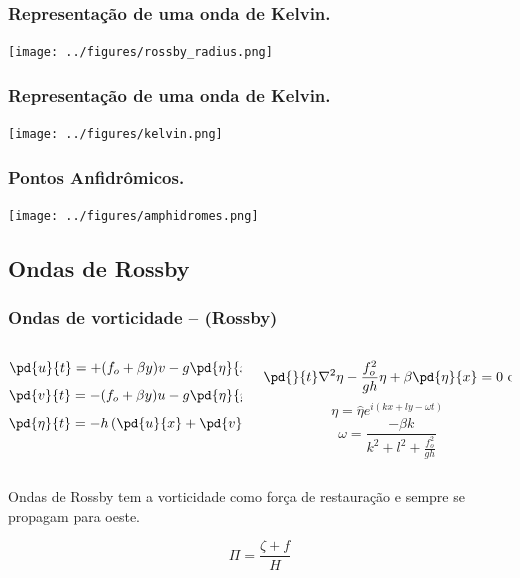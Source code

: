 \begin{frame}
  \frametitle{Representação de uma onda de Kelvin.}
  \begin{center}
    \texttt{[image: ../figures/rossby\_radius.png]}
  \end{center}
\end{frame}


\begin{frame}
  \frametitle{Representação de uma onda de Kelvin.}
  \begin{center}
    \texttt{[image: ../figures/kelvin.png]}
  \end{center}
\end{frame}

\begin{frame}
  \frametitle{Pontos Anfidrômicos.}
  \begin{center}
    \texttt{[image: ../figures/amphidromes.png]}
  \end{center}
\end{frame}

\subsection{Ondas de Rossby}
\begin{frame}
  \frametitle{Ondas de vorticidade -- (Rossby)}
{\scriptsize
  \begin{columns}
    \begin{column}{0.5\textwidth}
    \begin{block}{}
      \[ \pd{u}{t} = +(f_o + \beta y)v - g\pd{\eta}{x} \]
      \[ \pd{v}{t} = -(f_o + \beta y)u - g\pd{\eta}{y} \]
      \[ \pd{\eta}{t} = -h\left(\pd{u}{x} + \pd{v}{y}\right) \]
    \end{block}
    \end{column}
    \begin{column}{0.5\textwidth}
    \begin{block}{}
      \[\pd{}{t}\nabla^2\eta - \frac{f_o^2}{gh}\eta + \beta\pd{\eta}{x} = 0\text{ onde,}\]
      \[\eta = \hat{\eta}e^{i(kx + ly -\omega t)}\]
      \[\omega = \frac{-\beta k}{k^2 + l^2 + \frac{f_o^2}{gh}}\]
    \end{block}
    \end{column}
  \end{columns}
}
\vspace{0.5cm}
\pause
{\small
Ondas de Rossby tem a vorticidade como força de restauração e sempre se
propagam para oeste.

\[\Pi = \frac{\zeta + f}{H}\]
}
\end{frame}

